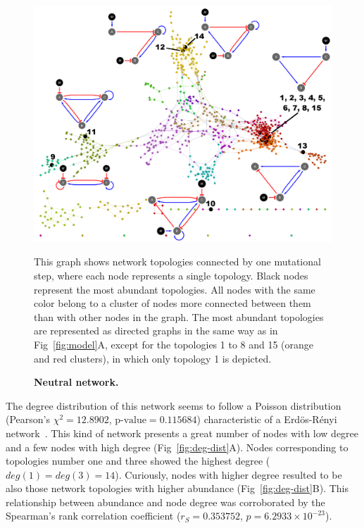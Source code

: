 \documentclass[10pt,letterpaper]{article}
\begin{document}
\begin{figure}[!h]
 \includegraphics[width=\textwidth]{figures/results/Fig3}
 \caption{\bf Neutral network.}
 This graph shows network topologies connected by one mutational step, where
 each node represents a single topology. Black nodes represent the most
 abundant topologies. All nodes with the same
 color belong to a cluster of nodes more connected between them than with other
 nodes in the graph. The most abundant topologies are represented as
 directed graphs in the same way as in Fig~\ref{fig:model}A, except for
 the topologies 1 to 8 and 15 (orange and red clusters), in which only
 topology 1 is depicted.
 \label{fig:neutral-network}
\end{figure}

The degree distribution of this network seems to follow a Poisson distribution
(Pearson’s $\chi^2 = 12.8902$, $\text{p-value} = 0.115684$) characteristic of a
Erdös-Rényi network~\cite{Erdos1959}. This kind of network presents a great
number of nodes with low degree and a few nodes with high degree
(Fig~\ref{fig:deg-dist}A). Nodes corresponding to topologies number one and
three showed the highest degree ($deg(1) = deg (3) = 14$). Curiously, nodes with
higher degree resulted to be also those network topologies with higher abundance
(Fig~\ref{fig:deg-dist}B). This relationship between abundance and node degree
was corroborated by the Spearman's rank correlation coefficient
($r_S = 0.353752$, $p = 6.2933\times10^{-23} $).
\end{document}
